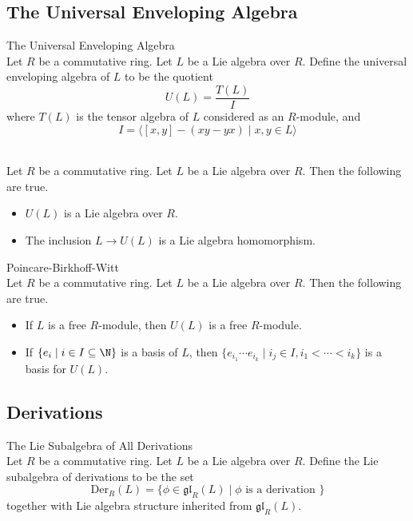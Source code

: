 \documentclass[a4paper]{article}
\begin{document}
\subsection{The Universal Enveloping Algebra}
\begin{defn}{The Universal Enveloping Algebra}{}\\
Let $R$ be a commutative ring. Let $L$ be a Lie algebra over $R$. Define the universal enveloping algebra of $L$ to be the quotient $$U(L)=\frac{T(L)}{I}$$ where $T(L)$ is the tensor algebra of $L$ considered as an $R$-module, and $$I=\langle[x,y]-(xy-yx)\;|\;x,y\in L\rangle$$
\end{defn}

\begin{lmm}{}{}\\
Let $R$ be a commutative ring. Let $L$ be a Lie algebra over $R$. Then the following are true. 
\begin{itemize}
\item $U(L)$ is a Lie algebra over $R$. 
\item The inclusion $L\to U(L)$ is a Lie algebra homomorphism. 
\end{itemize}
\end{lmm}

\begin{thm}{Poincare-Birkhoff-Witt}{}\\
Let $R$ be a commutative ring. Let $L$ be a Lie algebra over $R$. Then the following are true. 
\begin{itemize}
\item If $L$ is a free $R$-module, then $U(L)$ is a free $R$-module. 
\item If $\{e_i\;|\;i\in I\subseteq\N\}$ is a basis of $L$, then $\{e_{i_1}\cdots e_{i_k}\;|\;i_j\in I, i_1<\cdots<i_k\}$ is a basis for $U(L)$. 
\end{itemize}
\end{thm}

\subsection{Derivations}
\begin{defn}{The Lie Subalgebra of All Derivations}{}\\
Let $R$ be a commutative ring. Let $L$ be a Lie algebra over $R$. Define the Lie subalgebra of derivations to be the set $$\text{Der}_R(L)=\{\phi\in\mathfrak{gl}_R(L)\;|\;\phi\text{ is a derivation }\}$$ together with Lie algebra structure inherited from $\mathfrak{gl}_R(L)$. 
\end{defn}
\end{document}

